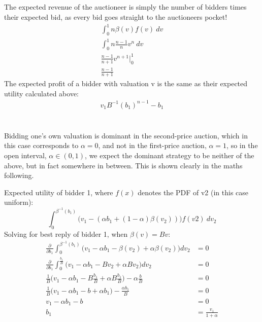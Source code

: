 \documentclass[a4paper,12pt]{article}
\begin{document}
\subsection{}
The expected revenue of the auctioneer is simply the number of bidders times their expected bid, as every bid goes straight to the auctioneers pocket!
%
\begin{align*}
\int_0^1 n \beta(v) f(v) \ dv \\
\int_0^1 n \frac{n - 1}{n} v^n \ dv \\
\frac{n - 1}{n + 1}v^{n + 1} \rvert_0^1 \\
\frac{n - 1}{n + 1}
\end{align*}
%
The expected profit of a bidder with valuation v is the same as their expected utility calculated above: 
%
\begin{align*}
v_1B^{-1}(b_1)^{n - 1} - b_1
\end{align*}
%

\section{}
\subsection{}
%
Bidding one's own valuation is dominant in the second-price auction, which in this case corresponds to $\alpha = 0$, and not in the first-price auction, $\alpha = 1$, so in the open interval, $\alpha \in (0,1)$, we expect the dominant strategy to be neither of the above, but in fact somewhere in between. This is shown clearly in the maths following. 

\Alph{\subsection{}}
Expected utility of bidder 1, where $f(x)$ denotes the PDF of v2 (in this case uniform):
%
$$
\int_{0}^{\beta^{-1}(b_1)} \bigg( v_1 - (\alpha b_1 + (1 - \alpha)\beta(v_2))  \bigg) f(v2) \ dv_2
$$
%
Solving for best reply of bidder 1, when $\beta(v) = Bv$: 
\begin{align*}
\frac{\partial}{\partial b_1} \int_{0}^{\beta^{-1}(b_1)} \bigg( v_1 - \alpha b_1  - \beta(v_2) + \alpha\beta(v_2)  \bigg) dv_2 &= 0\\
\frac{\partial}{\partial b_1} \int_{0}^{\frac{b_1}{B}} \bigg( v_1 - \alpha b_1  - Bv_2 + \alpha Bv_2 \bigg) dv_2 &= 0 \\
\frac{1}{B} \bigg(v_1 - \alpha b_1  - B\frac{b_1}{B} + \alpha B\frac{b_1}{B} \bigg) - \alpha \frac{b}{B} &= 0 \\
\frac{1}{B} \bigg( v_1 - \alpha b_1  - b + \alpha b_1 \bigg) - \frac{\alpha b_1}{B} &= 0 \\
v_1 - \alpha b_1  - b &= 0 \\
b_1 &= \frac{v_1}{1 + \alpha}
\end{align*}
%
\end{document}

